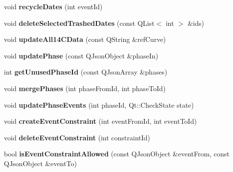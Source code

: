 \begin{DoxyCompactItemize}
\item 
\hypertarget{class_project_aa551069eaf4528ff84da2822b83736f9}{void {\bfseries recycle\-Dates} (int event\-Id)}\label{class_project_aa551069eaf4528ff84da2822b83736f9}

\item 
\hypertarget{class_project_ac08e76804ac0f0f967249b3c78378b24}{void {\bfseries delete\-Selected\-Trashed\-Dates} (const Q\-List$<$ int $>$ \&ids)}\label{class_project_ac08e76804ac0f0f967249b3c78378b24}

\item 
\hypertarget{class_project_ac4fe0240803449a795da56f2c777362c}{void {\bfseries update\-All14\-C\-Data} (const Q\-String \&ref\-Curve)}\label{class_project_ac4fe0240803449a795da56f2c777362c}

\item 
\hypertarget{class_project_aae30e0141b7f31c030c4562d376f54b1}{void {\bfseries update\-Phase} (const Q\-Json\-Object \&phase\-In)}\label{class_project_aae30e0141b7f31c030c4562d376f54b1}

\item 
\hypertarget{class_project_a327ff4d412ce2fe3cbdf67c38c5baddc}{int {\bfseries get\-Unused\-Phase\-Id} (const Q\-Json\-Array \&phases)}\label{class_project_a327ff4d412ce2fe3cbdf67c38c5baddc}

\item 
\hypertarget{class_project_a3b6cf562bc8d284efe8e7ab0d7e8827a}{void {\bfseries merge\-Phases} (int phase\-From\-Id, int phase\-To\-Id)}\label{class_project_a3b6cf562bc8d284efe8e7ab0d7e8827a}

\item 
\hypertarget{class_project_a9f2ab2466b486639ee0af8cafbec0e9e}{void {\bfseries update\-Phase\-Events} (int phase\-Id, Qt\-::\-Check\-State state)}\label{class_project_a9f2ab2466b486639ee0af8cafbec0e9e}

\item 
\hypertarget{class_project_a0bd20702c8700955b1b97461ddceea3c}{void {\bfseries create\-Event\-Constraint} (int event\-From\-Id, int event\-To\-Id)}\label{class_project_a0bd20702c8700955b1b97461ddceea3c}

\item 
\hypertarget{class_project_a777007d3fddfc48ca2f8f825a3fa5ea0}{void {\bfseries delete\-Event\-Constraint} (int constraint\-Id)}\label{class_project_a777007d3fddfc48ca2f8f825a3fa5ea0}

\item 
\hypertarget{class_project_a2fa26a2eeecfcd0b899161ba49816a81}{bool {\bfseries is\-Event\-Constraint\-Allowed} (const Q\-Json\-Object \&event\-From, const Q\-Json\-Object \&event\-To)}\label{class_project_a2fa26a2eeecfcd0b899161ba49816a81}


\end{DoxyCompactItemize}
